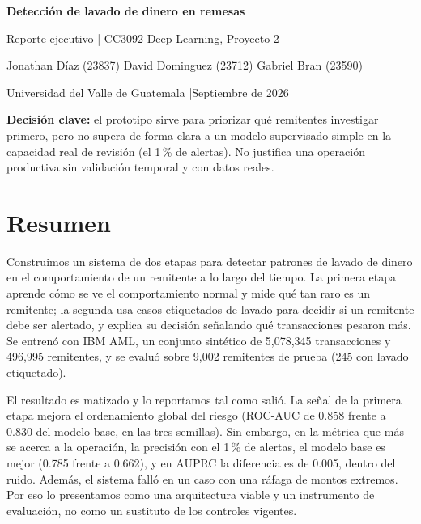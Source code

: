 \documentclass[11pt,a4paper]{article}
\begin{document}
\begin{center}
{\LARGE\bfseries Detección de lavado de dinero en remesas\par}
\vspace{0.3em}
{\large Reporte ejecutivo | CC3092 Deep Learning, Proyecto 2\par}
\vspace{0.6em}
{\normalsize Jonathan Díaz (23837) \quad David Dominguez (23712) \quad Gabriel Bran (23590)\par}
{\small Universidad del Valle de Guatemala \quad|\quad Septiembre de 2026\par}
\end{center}

\vspace{0.6em}
\noindent\textbf{Decisión clave:} el prototipo sirve para priorizar qué remitentes investigar primero, pero no supera de forma clara a un modelo supervisado simple en la capacidad real de revisión (el 1\,\% de alertas). No justifica una operación productiva sin validación temporal y con datos reales.

\section*{Resumen}
Construimos un sistema de dos etapas para detectar patrones de lavado de dinero en el comportamiento de un remitente a lo largo del tiempo. La primera etapa aprende cómo se ve el comportamiento normal y mide qué tan raro es un remitente; la segunda usa casos etiquetados de lavado para decidir si un remitente debe ser alertado, y explica su decisión señalando qué transacciones pesaron más. Se entrenó con IBM AML, un conjunto sintético de 5,078,345 transacciones y 496,995 remitentes, y se evaluó sobre 9,002 remitentes de prueba (245 con lavado etiquetado).

El resultado es matizado y lo reportamos tal como salió. La señal de la primera etapa mejora el ordenamiento global del riesgo (ROC-AUC de 0.858 frente a 0.830 del modelo base, en las tres semillas). Sin embargo, en la métrica que más se acerca a la operación, la precisión con el 1\,\% de alertas, el modelo base es mejor (0.785 frente a 0.662), y en AUPRC la diferencia es de 0.005, dentro del ruido. Además, el sistema falló en un caso con una ráfaga de montos extremos. Por eso lo presentamos como una arquitectura viable y un instrumento de evaluación, no como un sustituto de los controles vigentes.
\end{document}
